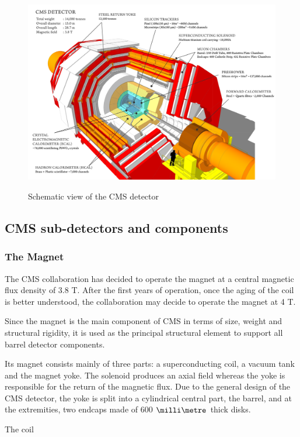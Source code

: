 \begin{figure}[h]
  \centering
\includegraphics[width=15cm]{CMS_chapter_plots/cms_120918_03}
\label{figure}\caption{Schematic view of the CMS detector}
\end{figure}


\subsection{CMS sub-detectors and components}

\subsubsection{The Magnet}

The CMS collaboration has decided to operate the magnet at a central magnetic flux density
of 3.8 T. After the first years of operation, once the aging of the coil is better understood, the
collaboration may decide to operate the magnet at 4 T.

Since the magnet is the main component of CMS in terms of size, weight and structural
rigidity, it is used as the principal structural element to support all barrel detector components.


Its magnet consists mainly of three parts: a superconducting coil, a vacuum tank and the magnet yoke. The solenoid produces an axial field whereas the yoke is responsible for the return of the magnetic flux. Due to the general design of the CMS detector, the yoke is split into a cylindrical central part, the barrel, and at the extremities, two endcaps made of 600 $\mm$ thick disks.


The coil

